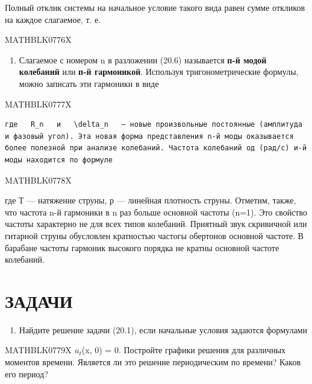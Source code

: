 \documentclass[
]{article}
\providecommand{\tightlist}{%
  \setlength{\itemsep}{0pt}\setlength{\parskip}{0pt}}
\begin{document}
Полный отклик системы на начальное условие такого вида равен сумме
откликов на каждое слагаемое, т. е.

MATHBLK0776X

\begin{enumerate}
\def\labelenumi{\arabic{enumi}.}
\setcounter{enumi}{1}
\tightlist
\item
  Слагаемое с номером n в разложении (20.6) называется \textbf{п-й модой
  колебаний} или \textbf{п-й гармоникой}. Используя тригонометрические
  формулы, можно записать эти гармоники в виде
\end{enumerate}

MATHBLK0777X

\begin{verbatim}
где   R_n   и   \delta_n   — новые произвольные постоянные (амплитуда и фазовый угол). Эта новая форма представления n-й моды оказывается более полезной при анализе колебаний. Частота колебаний од (рад/с) и-й моды находится по формуле
\end{verbatim}

MATHBLK0778X

где Т --- натяжение струны, р --- линейная плотность струны. Отметим,
также, что частота n-й гармоники в n раз больше основной частоты (n=1).
Это свойство частоты характерно не для всех типов колебаний. Приятный
звук скривичной или гитарной струны обусловлен кратностью частогы
обертонов основной частоте. В барабане частоты гармоник высокого порядка
не кратны основной частоте колебаний.

\section{ЗАДАЧИ}\label{ux437ux430ux434ux430ux447ux438-5}

\begin{enumerate}
\def\labelenumi{\arabic{enumi}.}
\tightlist
\item
  Найдите решение задачи (20.1), если начальные условия задаются
  формулами
\end{enumerate}

MATHBLK0779X \(u_t\)(x, 0) = 0. Постройте графики решения для различных
моментов времени. Является ли это решение периодическим по времени?
Каков его период?
\end{document}
